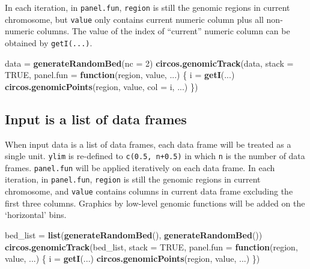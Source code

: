 \documentclass[]{book}
\newenvironment{Shaded}{\begin{snugshade}}{\end{snugshade}}
\newcommand{\KeywordTok}[1]{\textcolor[rgb]{0.13,0.29,0.53}{\textbf{#1}}}
\newcommand{\DataTypeTok}[1]{\textcolor[rgb]{0.13,0.29,0.53}{#1}}
\newcommand{\DecValTok}[1]{\textcolor[rgb]{0.00,0.00,0.81}{#1}}
\newcommand{\StringTok}[1]{\textcolor[rgb]{0.31,0.60,0.02}{#1}}
\newcommand{\OtherTok}[1]{\textcolor[rgb]{0.56,0.35,0.01}{#1}}
\newcommand{\ControlFlowTok}[1]{\textcolor[rgb]{0.13,0.29,0.53}{\textbf{#1}}}
\newcommand{\NormalTok}[1]{#1}
\begin{document}
In each iteration, in \texttt{panel.fun}, \texttt{region} is still the
genomic regions in current chromosome, but \texttt{value} only contains
current numeric column plus all non-numeric columns. The value of the
index of ``current'' numeric column can be obtained by
\texttt{getI(...)}.

\begin{Shaded}
\begin{Highlighting}[]
\NormalTok{data =}\StringTok{ }\KeywordTok{generateRandomBed}\NormalTok{(}\DataTypeTok{nc =} \DecValTok{2}\NormalTok{)}
\KeywordTok{circos.genomicTrack}\NormalTok{(data, }\DataTypeTok{stack =} \OtherTok{TRUE}\NormalTok{,}
    \DataTypeTok{panel.fun =} \ControlFlowTok{function}\NormalTok{(region, value, ...) \{}
\NormalTok{        i =}\StringTok{ }\KeywordTok{getI}\NormalTok{(...)}
        \KeywordTok{circos.genomicPoints}\NormalTok{(region, value, }\DataTypeTok{col =}\NormalTok{ i, ...)}
\NormalTok{\})}
\end{Highlighting}
\end{Shaded}

\subsection{Input is a list of data
frames}\label{input-is-a-list-of-data-frames-1}

When input data is a list of data frames, each data frame will be
treated as a single unit. \texttt{ylim} is re-defined to
\texttt{c(0.5,\ n+0.5)} in which \texttt{n} is the number of data
frames. \texttt{panel.fun} will be applied iteratively on each data
frame. In each iteration, in \texttt{panel.fun}, \texttt{region} is
still the genomic regions in current chromosome, and \texttt{value}
contains columns in current data frame excluding the first three
columns. Graphics by low-level genomic functions will be added on the
`horizontal' bins.

\begin{Shaded}
\begin{Highlighting}[]
\NormalTok{bed_list =}\StringTok{ }\KeywordTok{list}\NormalTok{(}\KeywordTok{generateRandomBed}\NormalTok{(), }\KeywordTok{generateRandomBed}\NormalTok{())}
\KeywordTok{circos.genomicTrack}\NormalTok{(bed_list, }\DataTypeTok{stack =} \OtherTok{TRUE}\NormalTok{,}
    \DataTypeTok{panel.fun =} \ControlFlowTok{function}\NormalTok{(region, value, ...) \{}
\NormalTok{        i =}\StringTok{ }\KeywordTok{getI}\NormalTok{(...)}
        \KeywordTok{circos.genomicPoints}\NormalTok{(region, value, ...)}
\NormalTok{\})}
\end{Highlighting}
\end{Shaded}
\end{document}
